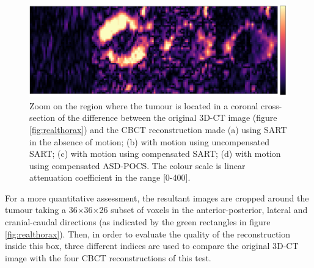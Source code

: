 \begin{figure}[H]
\begin{center} 
\includegraphics[width=1\linewidth]{MotionCorrection/tumourCC_err2.png}
\hspace{0.1cm}{\footnotesize (a)}\hspace{3.2cm}{\footnotesize (b)}\hspace{3.2cm}{\footnotesize (c)}\hspace{3.2cm}{\footnotesize (d)} 
\caption[Errors in the tumour area between the POPI model and recosntructed images]{\label{fig:tumourCC_err}  Zoom on the region where the tumour is located in a coronal cross-section of the difference  between the original 3D-CT image (figure \ref{fig:realthorax}) and the CBCT reconstruction made (a) using SART in the absence of motion; (b) with motion using uncompensated SART; (c) with motion using compensated SART; (d) with motion using compensated ASD-POCS. The colour scale is linear attenuation coefficient in the range [0-400].} 
\end{center} 
\end{figure}


For a more quantitative assessment, the resultant images are cropped around the tumour taking a 36$\times$36$\times$26 subset of voxels in the anterior-posterior, lateral and cranial-caudal directions (as indicated by the green rectangles in figure \ref{fig:realthorax}).  Then, in order to evaluate the quality of the reconstruction inside this box, three different indices are used to compare the original 3D-CT image with the four CBCT reconstructions of this test.

